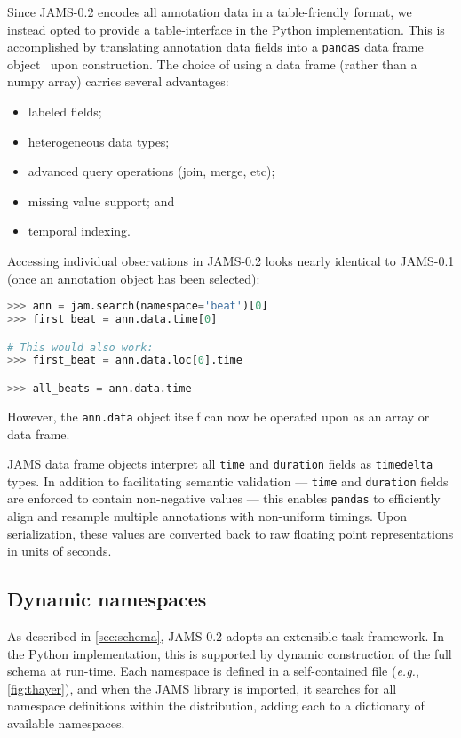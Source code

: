 \documentclass{article}
\begin{document}
Since JAMS-0.2 encodes all annotation data in a table-friendly format, we instead opted to
provide a table-interface in the Python implementation.  This is accomplished by
translating annotation data fields into a \texttt{pandas} data frame
object~\cite{mckinney-proc-scipy-2010} upon construction.
The choice of using a data frame (rather than a numpy array) carries several advantages:
\begin{itemize}
    \setlength\itemsep{0em}
    \item labeled fields;
    \item heterogeneous data types;
    \item advanced query operations (join, merge, etc);
    \item missing value support; and
    \item temporal indexing.
\end{itemize}

Accessing individual observations in JAMS-0.2 looks nearly identical to JAMS-0.1
(once an annotation object has been selected):
\begin{lstlisting}[language=python]
>>> ann = jam.search(namespace='beat')[0]
>>> first_beat = ann.data.time[0]

# This would also work:
>>> first_beat = ann.data.loc[0].time

>>> all_beats = ann.data.time
\end{lstlisting}
However, the \texttt{ann.data} object itself can now be operated upon as an array or
data frame.

JAMS data frame objects interpret all \texttt{time} and \texttt{duration} fields as
\texttt{timedelta} types.  In addition to facilitating semantic validation ---
\texttt{time} and \texttt{duration} fields are enforced to contain non-negative values --- 
this enables \texttt{pandas} to efficiently align and resample multiple annotations with 
non-uniform timings.  Upon serialization, these values are converted back to raw floating
point representations in units of seconds.


\subsection{Dynamic namespaces}\label{sec:imp:namespaces}
As described in \cref{sec:schema}, JAMS-0.2 adopts an extensible task framework.
In the Python implementation, this is supported by dynamic construction of the full
schema at run-time.
Each namespace is defined in a self-contained file (\emph{e.g.}, \cref{fig:thayer}), and
when the JAMS library is imported, it searches for all namespace definitions within the
distribution, adding each to a dictionary of available namespaces.
\end{document}
